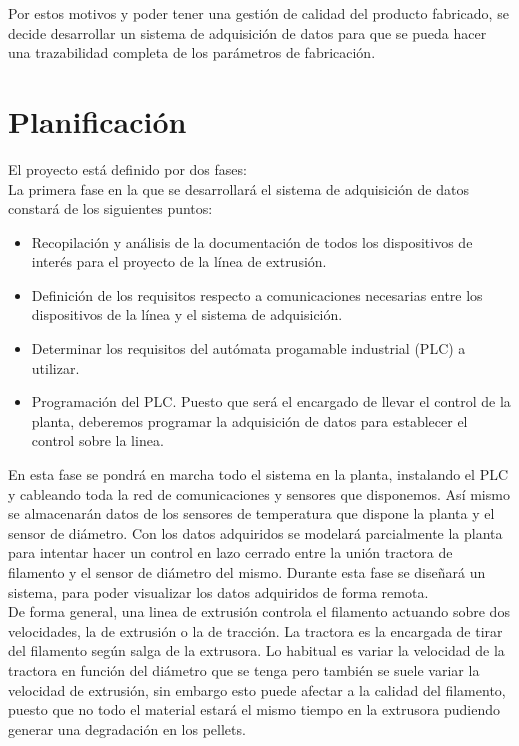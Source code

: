 Por estos motivos y poder tener una gestión de calidad del producto fabricado, se decide desarrollar un sistema de adquisición de datos para que se pueda hacer una trazabilidad completa de los parámetros de fabricación.\\
\pagebreak
\section{Planificación}
\label{sec:planificacion}

El proyecto está definido por dos fases:\\

La primera fase en la que se desarrollará el sistema de adquisición de datos constará de los siguientes puntos:

\begin{itemize}
    \item Recopilación y análisis de la documentación de todos los dispositivos de interés para el proyecto de la línea de extrusión.
    \item Definición de los requisitos respecto a comunicaciones necesarias entre los dispositivos de la línea y el sistema de adquisición.
    \item Determinar los requisitos del autómata progamable industrial (PLC) a utilizar.
    \item Programación del PLC. Puesto que será el encargado de llevar el control de la planta, deberemos programar la adquisición de datos para establecer el control sobre la linea.
\end{itemize}

En esta fase se pondrá en marcha todo el sistema en la planta, instalando el PLC y cableando toda la red de comunicaciones y sensores que disponemos. Así mismo se almacenarán datos de los sensores de temperatura que dispone la planta y el sensor de diámetro. Con los datos adquiridos se modelará parcialmente la planta para intentar hacer un control en lazo cerrado entre la unión tractora de filamento y el sensor de diámetro del mismo. Durante esta fase se diseñará un sistema, para poder visualizar los datos adquiridos de forma remota.\\

De forma general, una linea de extrusión controla el filamento actuando sobre dos velocidades, la de extrusión o la de tracción. La tractora es la encargada de tirar del filamento según salga de la extrusora. Lo habitual es variar la velocidad de la tractora en función del diámetro que se tenga pero también se suele variar la velocidad de extrusión, sin embargo esto puede afectar a la calidad del filamento, puesto que no todo el material estará el mismo tiempo en la extrusora pudiendo generar una degradación en los pellets.\\

